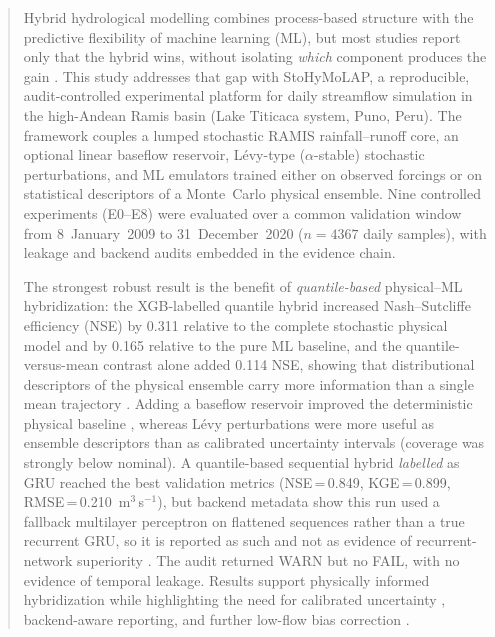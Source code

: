 \documentclass[a4paper,fleqn]{cas-sc}
\begin{document}
\begin{abstract}
Hybrid hydrological modelling combines process-based structure with the
predictive flexibility of machine learning (ML), but most studies report
only that the hybrid wins, without isolating \emph{which} component
produces the gain \citep{mekonnen2015,okkan2021}. This study addresses
that gap with StoHyMoLAP, a reproducible, audit-controlled experimental
platform for daily streamflow simulation in the high-Andean Ramis basin
(Lake Titicaca system, Puno, Peru). The framework couples a lumped
stochastic RAMIS rainfall--runoff core, an optional linear baseflow
reservoir, L\'{e}vy-type ($\alpha$-stable) stochastic perturbations, and
ML emulators trained either on observed forcings or on statistical
descriptors of a Monte~Carlo physical ensemble. Nine controlled
experiments (E0--E8) were evaluated over a common validation window from
8~January~2009 to 31~December~2020 ($n=4367$ daily samples), with
leakage and backend audits embedded in the evidence chain.

The strongest robust result is the benefit of \emph{quantile-based}
physical--ML hybridization: the XGB-labelled quantile hybrid increased
Nash--Sutcliffe efficiency (NSE) by 0.311 relative to the complete
stochastic physical model and by 0.165 relative to the pure ML baseline,
and the quantile-versus-mean contrast alone added 0.114 NSE, showing
that distributional descriptors of the physical ensemble carry more
information than a single mean trajectory
\citep{papacharalampous2022,swiderski2016}. Adding a baseflow reservoir
improved the deterministic physical baseline \citep{adnan2021comparison},
whereas L\'{e}vy perturbations were more useful as ensemble descriptors
than as calibrated uncertainty intervals (coverage was strongly below
nominal). A quantile-based sequential hybrid \emph{labelled} as GRU
reached the best validation metrics (NSE\,=\,0.849, KGE\,=\,0.899,
RMSE\,=\,0.210~m$^3$\,s$^{-1}$), but backend metadata show this run
used a fallback multilayer perceptron on flattened sequences rather than
a true recurrent GRU, so it is reported as such and not as evidence of
recurrent-network superiority \citep{hall2021}. The audit returned WARN
but no FAIL, with no evidence of temporal leakage. Results support
physically informed hybridization while highlighting the need for
calibrated uncertainty \citep{thiboult2016,crochemore2016}, backend-aware
reporting, and further low-flow bias correction \citep{pushpalatha2012}.
\end{abstract}
\end{document}

